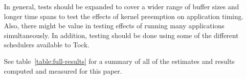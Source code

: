 \documentclass{article}
\begin{document}
In general, tests should be expanded to cover a wider range of buffer sizes and longer time spans to test the effects of kernel preemption on application timing. Also, there might be value in testing effects of running many applications simultaneously. In addition, testing should be done using some of the different schedulers available to Tock.

See table~\ref{table:full-results} for a summary of all of the estimates and results computed and measured for this paper.
 

\end{document}
